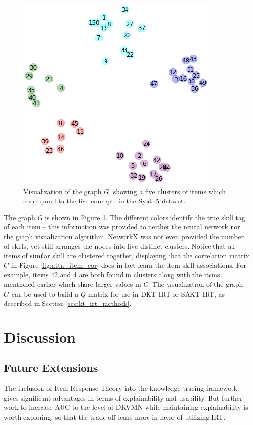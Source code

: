 \begin{figure}[h]
  \centering
  \includegraphics[width=.55\textwidth]{img/kt_irt/synth5_clusters_no_ffn.png}
  \caption{Visualization of the graph $G$, showing a five clusters of items which correspond to the five concepts in the Synth5 dataset.}
  \label{fig:synth5_clusters}
\end{figure}
The graph $G$ is shown in Figure \ref{fig:synth5_clusters}. The different colors identify the true skill tag of each item -- this information was provided to neither the neural network nor the graph visualization algorithm. NetworkX was not even provided the number of skills, yet still arranges the nodes into five distinct clusters. Notice that all items of similar skill are clustered together, displaying that the correlation matrix $C$ in Figure \ref{fig:attn_item_cor} does in fact learn the item-skill associations. For example, items 42 and 4 are both found in clusters along with the items mentioned earlier which share larger values in $C$. The visualization of the graph $G$ can be used to build a $Q$-matrix for use in DKT-IRT or SAKT-IRT, as described in Section \ref{sec:kt_irt_methods}.

\section{Discussion}

\subsection{Future Extensions}\label{sec:kt_future}
The inclusion of Item Response Theory into the knowledge tracing framework gives significant advantages in terms of explainability and usability. But further work to increase AUC to the level of DKVMN while maintaining explainability is worth exploring, so that the trade-off leans more in favor of utilizing IRT. 

